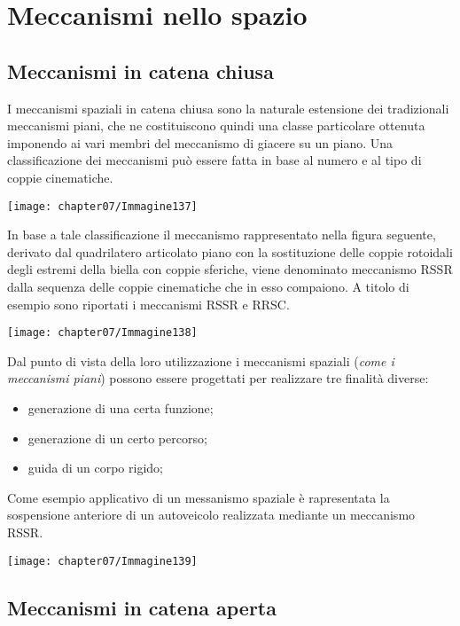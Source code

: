 \chapter{Meccanismi nello spazio}
	\section{Meccanismi in catena chiusa}
		I meccanismi spaziali in catena chiusa sono la naturale estensione dei tradizionali meccanismi piani, che ne costituiscono quindi una classe particolare ottenuta imponendo ai vari membri del meccanismo di giacere su un piano. Una classificazione dei meccanismi può essere fatta in base al numero e al tipo di coppie cinematiche.
		\begin{center}
		\texttt{[image: chapter07/Immagine137]}
		\end{center}
		
		In base a tale classificazione il meccanismo rappresentato nella figura seguente, derivato dal quadrilatero articolato piano con la sostituzione delle coppie rotoidali degli estremi della biella con coppie sferiche, viene denominato meccanismo RSSR dalla sequenza delle coppie cinematiche che in esso compaiono. A titolo di esempio sono riportati i meccanismi RSSR e RRSC.
		\begin{center}
		\texttt{[image: chapter07/Immagine138]}
		\end{center}

\begin{minipage}{.625\textwidth}
Dal punto di vista della loro utilizzazione i meccanismi spaziali (\emph{come i meccanismi piani}) possono essere progettati per realizzare tre finalità diverse:
\begin{itemize}
\item generazione di una certa funzione;
\item generazione di un certo percorso;
\item guida di un corpo rigido;
\end{itemize}
Come esempio applicativo di un messanismo spaziale è rapresentata la sospensione anteriore di un autoveicolo realizzata mediante un meccanismo RSSR.
\end{minipage}
\hfill
\begin{minipage}{.45\textwidth}
\centering
\texttt{[image: chapter07/Immagine139]}
\end{minipage}

\section{Meccanismi in catena aperta}


